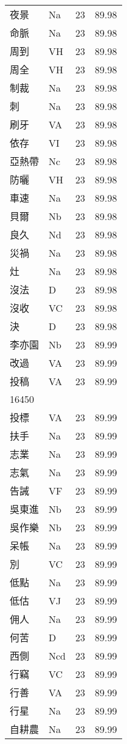 \documentclass[twocolumn]{book}
\begin{document}
\begin{supertabular}{llrr}
夜景 & Na & 23 &  89.98\\
命脈 & Na & 23 &  89.98\\
周到 & VH & 23 &  89.98\\
周全 & VH & 23 &  89.98\\
制裁 & Na & 23 &  89.98\\
刺 & Na & 23 &  89.98\\
刷牙 & VA & 23 &  89.98\\
依存 & VI & 23 &  89.98\\
亞熱帶 & Nc & 23 &  89.98\\
防曬 & VH & 23 &  89.98\\
車速 & Na & 23 &  89.98\\
貝爾 & Nb & 23 &  89.98\\
良久 & Nd & 23 &  89.98\\
災禍 & Na & 23 &  89.98\\
灶 & Na & 23 &  89.98\\
沒法 & D & 23 &  89.98\\
沒收 & VC & 23 &  89.98\\
決 & D & 23 &  89.98\\
李亦園 & Nb & 23 &  89.99\\
改過 & VA & 23 &  89.99\\
投稿 & VA & 23 &  89.99\\
16450\\
投標 & VA & 23 &  89.99\\
扶手 & Na & 23 &  89.99\\
志業 & Na & 23 &  89.99\\
志氣 & Na & 23 &  89.99\\
告誡 & VF & 23 &  89.99\\
吳東進 & Nb & 23 &  89.99\\
吳作樂 & Nb & 23 &  89.99\\
呆帳 & Na & 23 &  89.99\\
別 & VC & 23 &  89.99\\
低點 & Na & 23 &  89.99\\
低估 & VJ & 23 &  89.99\\
佣人 & Na & 23 &  89.99\\
何苦 & D & 23 &  89.99\\
西側 & Ncd & 23 &  89.99\\
行竊 & VC & 23 &  89.99\\
行善 & VA & 23 &  89.99\\
行星 & Na & 23 &  89.99\\
自耕農 & Na & 23 &  89.99\\

\end{supertabular}
\end{document}
